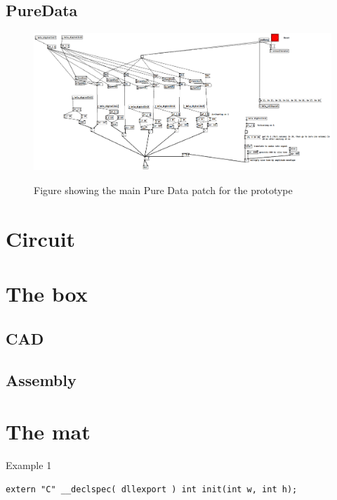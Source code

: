	\subsection{PureData}%
	\begin{figure}[H]
		\centering
		\includegraphics[width=1\linewidth]{figure/Implementation/pdPatch}
		\label{fig:pdPatch}
		\caption{Figure showing the main Pure Data patch for the prototype}
	\end{figure}	
	
\section{Circuit}


\section{The box}%

	\subsection{CAD}
		
	\subsection{Assembly}

\section{The mat}%

\begin{listing}[H]
	\caption{Example 1}
	\label{listing:example1}
	\begin{verbatim}
extern "C" __declspec( dllexport ) int init(int w, int h);
	\end{verbatim}
\end{listing}